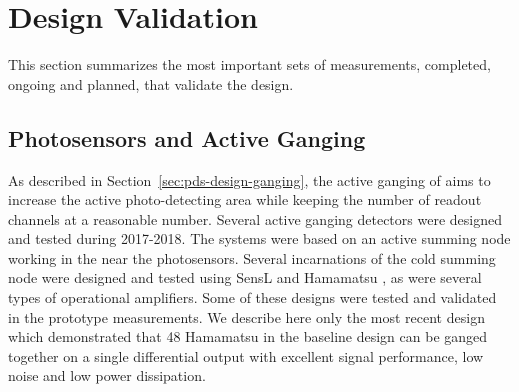 \section{Design Validation}
\label{sec:fdsp-pd-validation}


This section summarizes the most important sets of measurements, completed, ongoing and planned, that validate the  design. 


\subsection{Photosensors and Active Ganging}
\label{sec:pds-valid-ganging}

As described in Section~\ref{sec:pds-design-ganging}, the active ganging of  aims to increase the active photo-detecting area while keeping the number of readout channels at a reasonable number. 
Several active ganging detectors were designed and tested during 2017-2018. 
The systems were based on an active summing node working in the \lar near the photosensors. Several incarnations of the cold summing node were designed and tested using SensL and Hamamatsu , 
as were several types of operational amplifiers.
Some of these designs were tested and validated in the  prototype measurements.
We describe here only the most recent design which demonstrated that 48 Hamamatsu  in the baseline design can be ganged together on a single differential output with excellent signal performance, low noise and low power dissipation.

